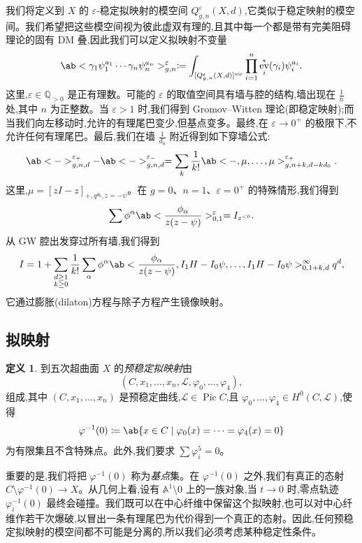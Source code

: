 \documentclass{amsart}
\theoremstyle{definition}
\newtheorem{defn}[thm]{定义}
\theoremstyle{remark}
\theoremstyle{plain}
\theoremstyle{definition}
\theoremstyle{remark}
\newcommand{\A}{\mathbb{A}}
\newcommand{\Q}{\mathbb{Q}}
\newcommand{\ep}{\varepsilon}
\newcommand{\mc}[1]{\mathcal{#1}}
\newcommand{\mr}[1]{\mathrm{#1}}
\newcommand{\1}{\mathbf{1}}
\newcommand{\2}{\mathbf{2}}
\newcommand{\3}{\mathbf{3}}
\newcommand{\vir}{\mr{vir}}
\DeclareMathOperator{\Pic}{Pic}
\DeclareMathOperator{\ev}{ev}
\begin{document}
我们将定义到 \(X\) 的 \(\ep\)-稳定拟映射的模空间 \(Q_{g,n}^{\ep}(X, d)\),它类似于稳定映射的模空间。我们希望把这些模空间视为彼此虚双有理的,且其中每一个都是带有完美阻碍理论的固有 DM 叠,因此我们可以定义拟映射不变量
\[ \ab< \gamma_1 \psi_1^{a_1} \cdots \gamma_n \psi_n^{a_n}>_{g,n}^{\ep} \coloneqq \int_{[Q_{g,n}^{\ep}(X,d)]^{\vir}} \prod_{i=1}^n \ev_i^*(\gamma_i) \psi_i^{a_i}. \]
这里,\(\ep \in \Q_{>0}\) 是正有理数。可能的 \(\ep\) 的取值空间具有墙与腔的结构,墙出现在 \(\frac{1}{n}\) 处,其中 \(n\) 为正整数。当 \(\ep > 1\) 时,我们得到 Gromov–Witten 理论(即稳定映射);而当我们向左移动时,允许的有理尾巴变少,但基点变多。最终,在 \(\ep \to 0^+\) 的极限下,不允许任何有理尾巴。最后,我们在墙 \(\frac{1}{d_0}\) 附近得到如下穿墙公式:
\[ \ab<->_{g,n,d}^{\ep_+} - \ab<->_{g,n,d}^{\ep_-} = \sum_{k} \frac{1}{k!} \ab<-, \mu, \ldots, \mu>_{g,n+k, d-kd_0}^{\ep_+}. \]
这里,\(\mu = [zI-z]_{+, q^{d_0}, z=-\psi}\)。在 \(g = 0\)、\(n = 1\)、\(\ep = 0^+\) 的特殊情形,我们得到
\[ \sum \phi^{\alpha} \ab<\frac{\phi_{\alpha}}{z(z-\psi)}>^{\ep}_{0,1} = I_{z^{<0}}. \]
从 GW 腔出发穿过所有墙,我们得到
\[ I = 1 + \sum_{\substack{d \geq 1 \\ k \geq 0}} \frac{1}{k!} \sum_{\alpha} \phi^{\alpha} \ab< \frac{\phi_{\alpha}}{z(z-\psi)}, I_1 H - I_0 \psi, \ldots, I_1 H - I_0 \psi>_{0,1+k,d}^{\infty} q^d, \]
它通过膨胀(dilaton)方程与除子方程产生镜像映射。

\subsection{拟映射}%
\label{sub:Quasimaps}

\begin{defn}
    到五次超曲面 \(X\) 的\textit{预稳定拟映射}由
    \[(C, x_1, \ldots, x_n, \mc{L}, \varphi_0, \ldots, \varphi_4),\]
    组成,其中 \((C, x_1, \ldots, x_n)\) 是预稳定曲线,\(\mc{L} \in \Pic C\),且 \(\varphi_0, \ldots, \varphi_4 \in H^0(C, \mc{L})\),使得
    \[ \varphi^{-1}(0) \coloneqq \ab\{x \in C \mid \varphi_0(x) = \cdots = \varphi_4(x) = 0 \} \]
    为有限集且不含特殊点。此外,我们要求 \(\sum \varphi_i^5 = 0\)。
\end{defn}

重要的是,我们将把 \(\varphi^{-1}(0)\) 称为\textit{基点}集。在 \(\varphi^{-1}(0)\) 之外,我们有真正的态射 \(C \setminus \varphi^{-1}(0) \to X\)。从几何上看,设有 \(\A^1 \setminus 0\) 上的一族对象,当 \(t \to 0\) 时,零点轨迹 \(\varphi_i^{-1}(0)\) 最终会碰撞。我们既可以在中心纤维中保留这个拟映射,也可以对中心纤维作若干次爆破,以冒出一条有理尾巴为代价得到一个真正的态射。因此,任何预稳定拟映射的模空间都不可能是分离的,所以我们必须考虑某种稳定性条件。
\end{document}
